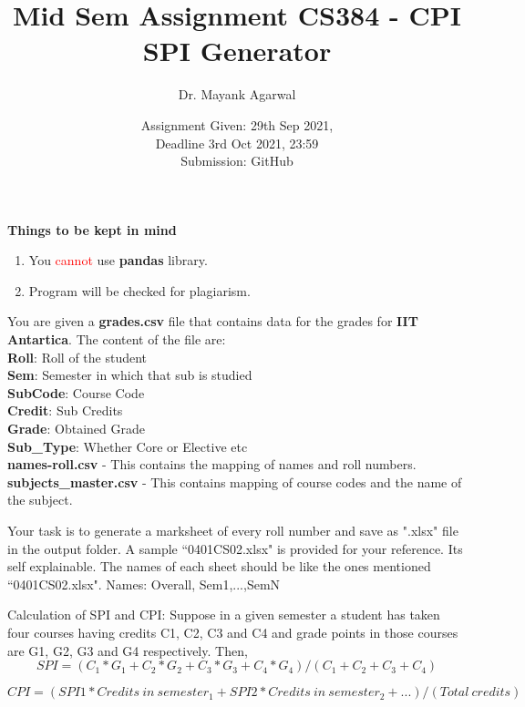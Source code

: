 \documentclass[12pt,  letterpaper,  twoside]{article}
\title{Mid Sem Assignment CS384 -  CPI SPI Generator}
\author{Dr. Mayank Agarwal}
\date{Assignment Given: 29th Sep 2021,\\ Deadline 3rd Oct 2021,  
23:59\\Submission: GitHub }
\begin{document}
	\maketitle  
	\textbf{Things to be kept in mind}\\
	\begin{enumerate}
				\item You \textcolor{red}{cannot }use \textbf{pandas} 
library.   
\item Program will be checked for plagiarism.   

	\end{enumerate}
	
	
You are given a \textbf{grades.csv} file that contains data for the grades for 
\textbf{IIT 
Antartica}. 	The content of the file are: \\
\textbf{Roll}: Roll of the student\\	
\textbf{Sem}: Semester in which that sub is studied	\\
\textbf{SubCode}: Course Code \\	
\textbf{Credit}: Sub Credits\\	
\textbf{Grade}: Obtained Grade\\	
\textbf{Sub\_Type}: Whether Core or Elective etc \\

\textbf{names-roll.csv} - This contains the mapping of names and roll numbers.\\

\textbf{subjects\_master.csv} - This contains mapping of course codes and the 
name of the subject. 

Your task is to generate a marksheet of every roll number and save as ".xlsx" 
file in the output folder. A sample ``0401CS02.xlsx" is provided for your 
reference. Its self explainable. The names of each sheet should be like the 
ones mentioned ``0401CS02.xlsx". Names: Overall, Sem1,...,SemN 



Calculation of SPI and CPI:
Suppose in a given semester a student has taken four courses having credits C1, 
C2, C3 and C4 and
grade points in those courses are G1, G2, G3 and G4 respectively. Then,
\begin{equation}
	SPI = (C_1 * G_1 + C_2 * G_2 + C_3 * G_3 + C_4 * G_4) / (C_1 + C_2 + C_3 + 
	C_4)
\end{equation}

\begin{equation}
	CPI = (SPI1 * Credits\ in\ semester_1 + SPI2 * Credits\ in\ semester_2 + 
	...) / (Total\ credits)
\end{equation}
\end{document}
